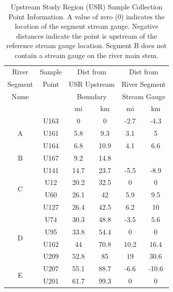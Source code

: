 \begin{linenumbers}
\begin{table}[htbp]
	\centering
	\caption[Upstream Study Region (USR) Sample Collection Point Information.]{Upstream Study Region (USR) Sample Collection Point Information.  A value of zero (0) indicates the location of the segment stream gauge.  Negative distances indicate the point is upstream of the reference stream gauge location. Segment B does not contain a stream gauge on the river main stem.}
	\label{tab:USRSampleLoc}
	\begin{tabular}{cccccc}
		\toprule
		River                       & Sample &  \multicolumn{2}{c}{Dist from}   &   \multicolumn{2}{c}{Dist from}   \\
		Segment                      & Point  & \multicolumn{2}{c}{USR Upstream} & \multicolumn{2}{c}{River Segment} \\
		Name                        &        &   \multicolumn{2}{c}{Boundary}   & \multicolumn{2}{c}{Stream Gauge}  \\
		\cmidrule(r{.5em}l){3-4} \cmidrule(r{.5em}l){5-6} &        &  mi  &            km             &  mi  &             km             \\ \toprule
		\multirow{3}{*}{A}                 &  U163  &  0   &             0             & -2.7 &            -4.3            \\
		&  U161  & 5.8  &            9.3            & 3.1  &             5              \\
		&  U164  & 6.8  &           10.9            & 4.1  &            6.6             \\ \midrule
		B                         &  U167  & 9.2  &           14.8            &      &  \\ \midrule
		\multirow{4}{*}{C}                 &  U141  & 14.7 &           23.7            & -5.5 &            -8.9            \\
		&  U12   & 20.2 &           32.5            &  0   &             0              \\
		&  U60   & 26.1 &            42             & 5.9  &            9.5             \\
		&  U127  & 26.4 &           42.5            & 6.2  &             10             \\ \midrule
		\multirow{4}{*}{D}                 &  U74   & 30.3 &           48.8            & -3.5 &            5.6             \\
		&  U95   & 33.8 &           54.4            &  0   &             0              \\
		&  U162  &  44  &           70.8            & 10.2 &            16.4            \\
		&  U209  & 52.8 &            85             &  19  &            30.6            \\ \midrule
		\multirow{2}{*}{E}                 &  U207  & 55.1 &           88.7            & -6.6 &           -10.6            \\
		&  U201  & 61.7 &           99.3            &  0   &             0              \\ \bottomrule
	\end{tabular}
\end{table}


\end{linenumbers}
